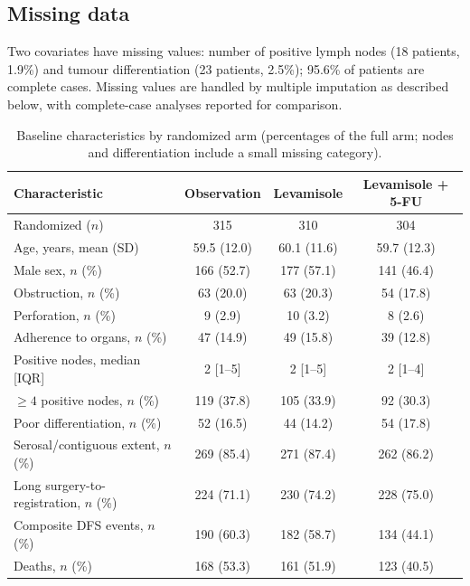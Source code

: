 \subsection{Missing data}

Two covariates have missing values: number of positive lymph nodes
(18 patients, 1.9\%) and tumour differentiation (23 patients, 2.5\%);
95.6\% of patients are complete cases. Missing values are handled by
multiple imputation as described below, with complete-case analyses
reported for comparison.

\begin{table}[htbp]
\centering\small
\caption{Baseline characteristics by randomized arm (percentages of the
full arm; nodes and differentiation include a small missing category).}
\label{tab:table1}
\begin{tabular*}{\textwidth}{@{\extracolsep{\fill}} l c c c}
\toprule
Characteristic & Observation & Levamisole & Levamisole + 5-FU \\
\midrule
Randomized ($n$)              & 315 & 310 & 304 \\
Age, years, mean (SD)         & 59.5 (12.0) & 60.1 (11.6) & 59.7 (12.3) \\
Male sex, $n$ (\%)            & 166 (52.7) & 177 (57.1) & 141 (46.4) \\
Obstruction, $n$ (\%)         & 63 (20.0)  & 63 (20.3)  & 54 (17.8)  \\
Perforation, $n$ (\%)         & 9 (2.9)   & 10 (3.2)   & 8 (2.6)   \\
Adherence to organs, $n$ (\%) & 47 (14.9)  & 49 (15.8)  & 39 (12.8)  \\
Positive nodes, median [IQR]  & 2 [1--5]   & 2 [1--5]   & 2 [1--4]   \\
$\geq 4$ positive nodes, $n$ (\%) & 119 (37.8) & 105 (33.9) & 92 (30.3) \\
Poor differentiation, $n$ (\%)& 52 (16.5)  & 44 (14.2)  & 54 (17.8)  \\
Serosal/contiguous extent, $n$ (\%) & 269 (85.4) & 271 (87.4) & 262 (86.2) \\
Long surgery-to-registration, $n$ (\%) & 224 (71.1) & 230 (74.2) & 228 (75.0) \\
\midrule
Composite DFS events, $n$ (\%) & 190 (60.3) & 182 (58.7) & 134 (44.1) \\
Deaths, $n$ (\%)                & 168 (53.3) & 161 (51.9) & 123 (40.5) \\
\bottomrule
\end{tabular*}
\end{table}

